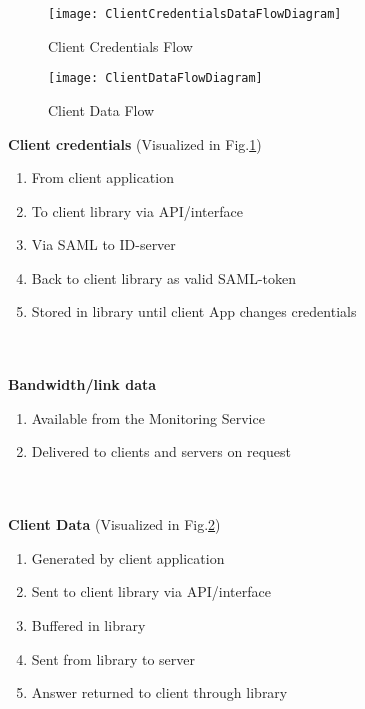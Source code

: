     \begin{figure}[h]
        \centering
        \texttt{[image: ClientCredentialsDataFlowDiagram]}
        \caption{Client Credentials Flow}
        \label{fig:ClientCredentialsDataFlowDiagram}
    \end{figure}
    
    \begin{figure}[h]
        \centering
        \texttt{[image: ClientDataFlowDiagram]}
        \caption{Client Data Flow}
        \label{fig:ClientDataFlowDiagram}
    \end{figure}
    
		\textbf{Client credentials} (Visualized in Fig.\ref{fig:ClientCredentialsDataFlowDiagram})
		\begin{enumerate}
			\item From client application
			\item To client library via API/interface
			\item Via SAML to ID-server
			\item Back to client library as valid SAML-token
			\item Stored in library until client App changes credentials
		\end{enumerate}
		\\\\
		\textbf{Bandwidth/link data}
		\begin{enumerate}
			\item Available from the Monitoring Service
			\item Delivered to clients and servers on request
		\end{enumerate}
		\\\\
		\textbf{Client Data} (Visualized in Fig.\ref{fig:ClientDataFlowDiagram})
		\begin{enumerate}
			\item Generated by client application
			\item Sent to client library via API/interface
			\item Buffered in library
			\item Sent from library to server
			\item Answer returned to client through library
		\end{enumerate}
		
